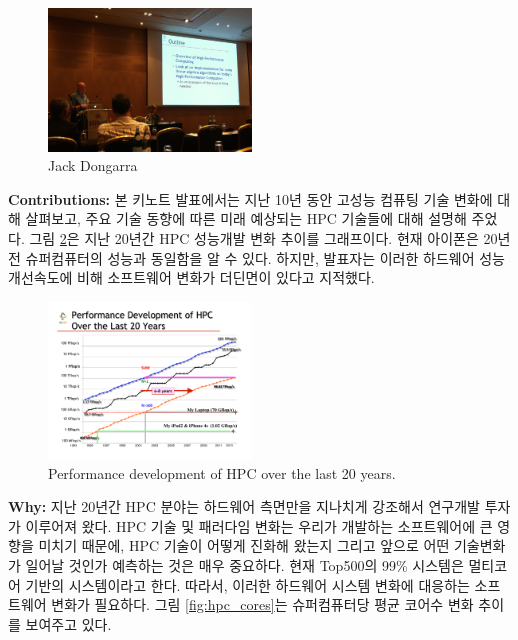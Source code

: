 \documentclass[twocolumn]{article}
\begin{document}
\begin{figure}[htb]
        \centering
        \includegraphics[width=0.48\textwidth]{hpc-keynote.png}
        \caption{Jack Dongarra}
        \label{fig:hpc_keynote}
\end{figure}

\noindent
\textbf{Contributions:} 본 키노트 발표에서는 지난 10년 동안 고성능 컴퓨팅 기술 변화에 대해 살펴보고, 주요 기술 동향에 따른 미래 예상되는 HPC 기술들에 대해 설명해 주었다. 그림 \ref{fig:hpc_20}은 지난 20년간 HPC 성능개발 변화 추이를 그래프이다. 현재 아이폰은 20년전 슈퍼컴퓨터의 성능과 동일함을 알 수 있다. 하지만, 발표자는 이러한 하드웨어 성능 개선속도에 비해 소프트웨어 변화가 더딘면이 있다고 지적했다.

\begin{figure}[htb]
        \centering
        \includegraphics[width=0.48\textwidth]{hpc-20-years.pdf}
        \caption{Performance development of HPC over the last 20 years.}
        \label{fig:hpc_20}
\end{figure}
\noindent
\textbf{Why:}  지난 20년간 HPC 분야는 하드웨어 측면만을 지나치게 강조해서 연구개발 투자가 이루어져 왔다. HPC 기술 및 패러다임 변화는 우리가 개발하는 소프트웨어에 큰 영향을 미치기 때문에, HPC 기술이 어떻게 진화해 왔는지 그리고 앞으로 어떤 기술변화가 일어날 것인가 예측하는 것은 매우 중요하다. 현재 Top500의 99\% 시스템은 멀티코어 기반의 시스템이라고 한다. 따라서, 이러한 하드웨어 시스템 변화에 대응하는 소프트웨어 변화가 필요하다. 그림 \ref{fig:hpc_cores}는 슈퍼컴퓨터당 평균 코어수 변화 추이를 보여주고 있다.
\end{document}
